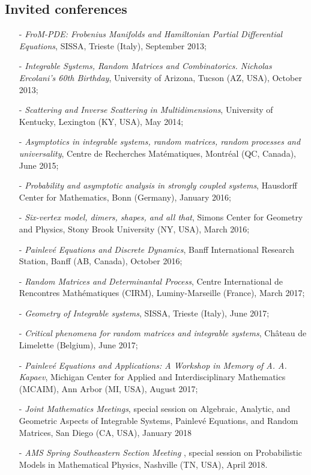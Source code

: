 \documentclass[margin]{res}
\begin{document}
\begin{resume}
 \section{Invited conferences}
\begin{itemize}\itemsep -2pt
\item[-] \emph{FroM-PDE: Frobenius Manifolds and Hamiltonian Partial Differential Equations}, SISSA, Trieste (Italy), September 2013;
\item[-] \emph{Integrable Systems, Random Matrices and Combinatorics. Nicholas Ercolani's 60th Birthday}, University of Arizona, Tucson (AZ, USA), October 2013;
\item[-] \emph{Scattering and Inverse Scattering in Multidimensions}, University of Kentucky, Lexington (KY, USA), May 2014;
\item[-] \emph{Asymptotics in integrable systems, random matrices, random processes and universality}, Centre de Recherches Mat\'ematiques, Montr\'eal (QC, Canada), June 2015;
\item[-] \emph{Probability and asymptotic analysis in strongly coupled systems}, Hausdorff Center for Mathematics, Bonn (Germany), January 2016;
\item[-] \emph{Six-vertex model, dimers, shapes, and all that}, Simons Center for Geometry and Physics, Stony Brook University (NY, USA), March 2016;
\item[-] \emph{Painlev\'e Equations and Discrete Dynamics}, Banff International Research Station, Banff (AB, Canada), October 2016;
\item[-] \emph{Random Matrices and Determinantal Process}, Centre International de Rencontres Math\'ematiques (CIRM), Luminy-Marseille (France), March 2017;
\item[-] \emph{Geometry of Integrable systems}, SISSA, Trieste (Italy), June 2017; 
\item[-] \emph{Critical phenomena for random matrices and integrable systems}, Ch\^{a}teau de Limelette (Belgium), June 2017;
\item[-] \emph{Painlev\'e Equations and Applications:  A Workshop in Memory of A. A. Kapaev}, Michigan Center for Applied and Interdisciplinary Mathematics (MCAIM), Ann Arbor (MI, USA), August 2017;
\item[-] \emph{Joint Mathematics Meetings}, special session on Algebraic, Analytic, and Geometric Aspects of Integrable Systems, Painlev\'e Equations, and Random Matrices, San Diego (CA, USA), January 2018
\item[-] \emph{AMS Spring Southeastern Section Meeting }, special session on Probabilistic Models in Mathematical Physics, Nashville (TN, USA), April 2018. \\
\end{itemize}


\end{resume}
\end{document}
